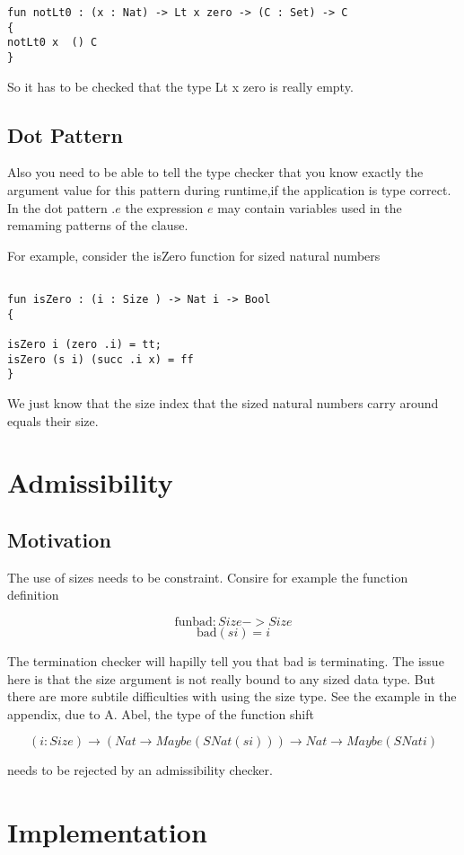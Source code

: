 \begin{verbatim}
fun notLt0 : (x : Nat) -> Lt x zero -> (C : Set) -> C
{
notLt0 x  () C 
}
\end{verbatim}
So it has to be checked that the type Lt x zero is really empty.

\subsection{Dot Pattern}
Also you need to be able to tell the type checker that you know exactly the argument value for this pattern during runtime,if the application is type correct.
In the dot pattern $ . e $ the expression $ e $ may contain variables used in the remaming patterns of the clause.

For example, consider the isZero function for sized natural numbers

\begin{verbatim}

fun isZero : (i : Size ) -> Nat i -> Bool
{

isZero i (zero .i) = tt;
isZero (s i) (succ .i x) = ff
}
\end{verbatim}
We just know that the size index that the sized natural numbers carry around equals their size.

\section{Admissibility}

\subsection{Motivation}
The use of sizes needs to be constraint.
Consire for example the function definition

\[ \mathrm{fun} \mathrm{bad} : Size -> Size \]
\[ \mathrm{bad} (s i) = i \]

The termination checker will hapilly tell you that bad is terminating.
The issue here is that the size argument is not really bound to any sized data type.
But there are more subtile difficulties with using the size type.
See the example in the appendix, due to A. Abel,
the type of the function shift

\[ (i : Size) \rightarrow (Nat \rightarrow Maybe (SNat (s i))) \rightarrow Nat \rightarrow Maybe (SNat i) \] 

needs to be rejected by an admissibility checker.


\section{Implementation}

